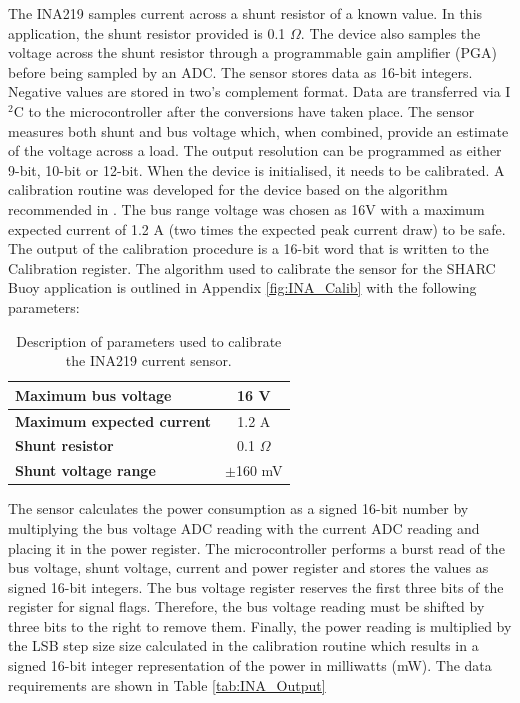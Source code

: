 The INA219 samples current across a shunt resistor of a known value. In this application, the shunt resistor provided is 0.1 $\Omega$. The device also samples the voltage across the shunt resistor through a programmable gain amplifier (PGA) before being sampled by an ADC. The sensor stores data as 16-bit integers. Negative values are stored in two's complement format. Data are transferred via I$^2$C to the microcontroller after the conversions have taken place. The sensor measures both shunt and bus voltage which, when combined, provide an estimate of the voltage across a load. The output resolution can be programmed as either 9-bit, 10-bit or 12-bit. When the device is initialised, it needs to be calibrated.  A calibration routine was developed for the device based on the algorithm recommended in \cite{INA219}. The bus range voltage was chosen as 16V with a maximum expected current of 1.2 A (two times the expected peak current draw) to be safe. The output of the calibration procedure is a 16-bit word that is written to the Calibration register. The algorithm used to calibrate the sensor for the SHARC Buoy application is outlined in Appendix \ref{fig:INA_Calib} with the following parameters:
\begin{table}[H]
	\centering
	\caption{ Description of parameters used to calibrate the INA219 current sensor.}
	\setlength{\extrarowheight}{5pt}
	\begin{tabular}{l  c}
		\hline
		\hline
		\textbf{Maximum bus voltage}& 16 V \\
		\hline
		\textbf{Maximum expected current} & 1.2 A \\
		\hline
		\textbf{Shunt resistor} & 0.1 $\Omega$ \\
		\hline
		\textbf{Shunt voltage range} & $\pm$160 mV\\
		\hline
		\hline
	\end{tabular}
	
	\label{tab:INA_Calib}
\end{table}

The sensor calculates the power consumption as a signed 16-bit number by multiplying the bus voltage ADC reading with the current ADC reading and placing it in the power register. The microcontroller performs a burst read of the bus voltage, shunt voltage, current and power register and stores the values as signed 16-bit integers. The bus voltage register reserves the first three bits of the register for signal flags. Therefore, the bus voltage reading must be shifted by three bits to the right to remove them. Finally, the power reading is multiplied by the LSB step size size calculated in the calibration routine which results in a signed 16-bit integer representation of the power in milliwatts (mW). The data requirements are shown in Table \ref{tab:INA_Output}

